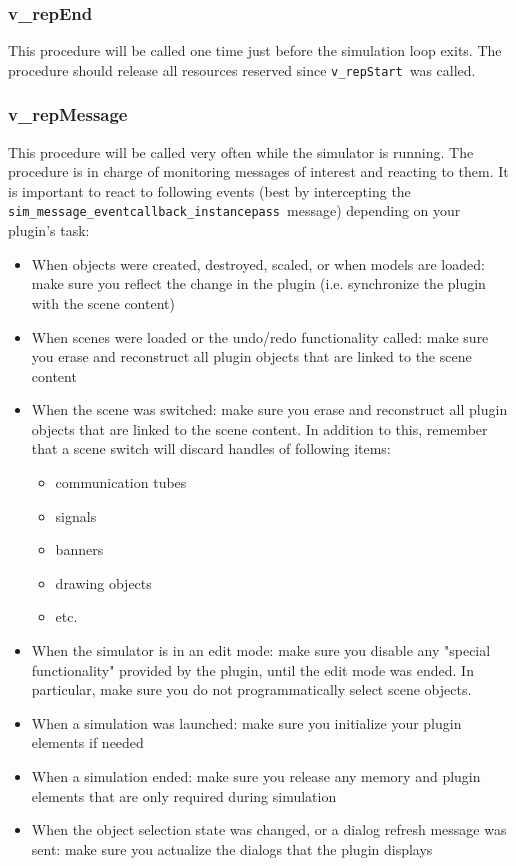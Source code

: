 \subsubsection{v\_repEnd}

This procedure will be called one time just before the simulation loop exits. 
The procedure should release all resources reserved since 
\verb|v_repStart|\ was called.

\subsubsection{v\_repMessage}

This procedure will be called very often while the simulator is running. The 
procedure is in charge of monitoring messages of interest and reacting to them. 
It is important to react to following events (best by intercepting the 
\verb|sim_message_eventcallback_instancepass|\ message) depending on your 
plugin's task:

\begin{itemize}[nosep]
\item 
When objects were created, destroyed, scaled, or when models are loaded: make 
sure you reflect the change in the plugin (i.e. synchronize the plugin with
the scene content)
\item 
When scenes were loaded or the undo/redo functionality called: make sure you 
erase and reconstruct all plugin objects that are linked to the scene content
\item 
When the scene was switched: make sure you erase and reconstruct all plugin 
objects that are linked to the scene content. In addition to this, remember
that a scene switch will discard handles of following items:
\begin{itemize}[nosep]
\item communication tubes
\item signals
\item banners
\item drawing objects
\item etc.
\end{itemize}
\item 
When the simulator is in an edit mode: make sure you disable any "special 
functionality" provided by the plugin, until the edit mode was ended. In 
particular, make sure you do not programmatically select scene objects.
\item 
When a simulation was launched: make sure you initialize your plugin elements 
if needed
\item 
When a simulation ended: make sure you release any memory and plugin elements
that are only required during simulation
\item 
When the object selection state was changed, or a dialog refresh message was 
sent: make sure you actualize the dialogs that the plugin displays
\end{itemize}

